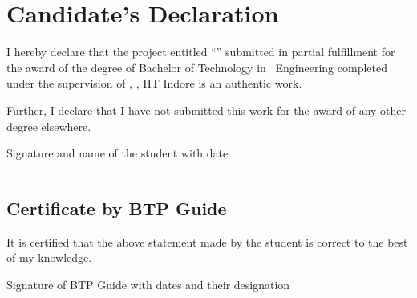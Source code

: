 \chapter*{Candidate's Declaration}
\thispagestyle{plain}

I hereby declare that the project entitled ``\btptitle'' submitted in partial fulfillment for the award of the
degree of Bachelor of Technology in \btpdiscipline\ Engineering completed under the supervision of
\btpguide, \btpguidedesignation, IIT Indore is an authentic work.

Further, I declare that I have not submitted this work for the award of any other degree elsewhere.

\vspace{1.5cm}
\noindent Signature and name of the student with date

\vspace{0.6cm}
\noindent\rule{\textwidth}{0.4pt}

\section*{Certificate by BTP Guide}

It is certified that the above statement made by the student is correct to the best of my knowledge.

\vspace{1.5cm}
\noindent Signature of BTP Guide with dates and their designation
\cleardoublepage
